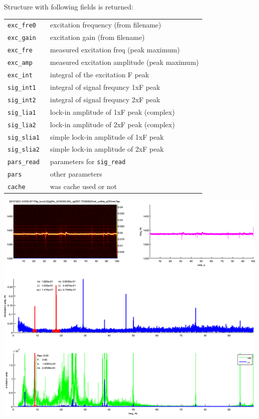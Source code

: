 \documentclass[a4paper]{article}
\begin{document}
Structure with following fields is returned:

\medskip\noindent
\begin{tabular}{p{3cm}p{14cm}}\hline
\tt exc\_fre0  & excitation frequency (from filename)\\
\tt exc\_gain  & excitation gain (from filename)\\
\tt exc\_fre   & measured excitation freq (peak maximum)\\
\tt exc\_amp   & measured excitation amplitude (peak maximum)\\
\tt exc\_int   & integral of the excitation F peak\\
\tt sig\_int1  & integral of signal frequncy 1xF peak\\
\tt sig\_int2  & integral of signal frequncy 2xF peak\\
\tt sig\_lia1  & lock-in amplitude of 1xF peak (complex)\\
\tt sig\_lia2  & lock-in amplitude of 2xF peak (complex)\\
\tt sig\_slia1 & simple lock-in amplitude of 1xF peak\\
\tt sig\_slia2 & simple lock-in amplitude of 2xF peak\\
\tt pars\_read & parameters for {\tt sig\_read}\\
\tt pars       & other parameters\\
\tt cache      & was cache used or not\\
\hline
\end{tabular}
\medskip

\medskip{}

\medskip
\noindent
\includegraphics[width=\textwidth]{sig_freq_cw}
\end{document}
